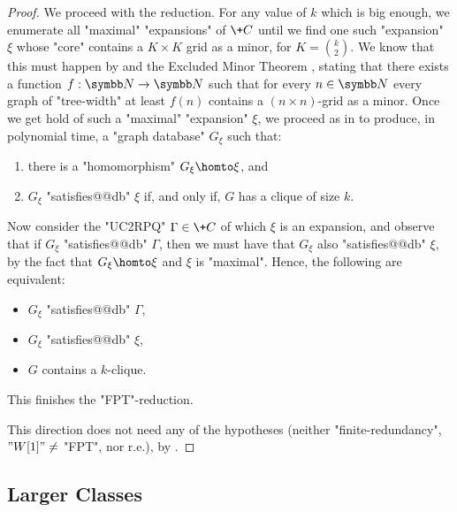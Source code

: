\begin{proof}
    We proceed with the reduction.
    For any value of $k$ which is big enough, we enumerate all "maximal" "expansions" of $\+C$ until we find one such "expansion" $\xi$ whose "core" contains a $K \times K$ grid as a minor, for $K = {k \choose 2}$.
    We know that this must happen by  and the Excluded Minor Theorem \cite{RobertsonSeymour1986GraphMinors5}, stating that there exists a function $f : \N \to \N$ such that for every $n \in \N$ every graph of "tree-width" at least $f(n)$ contains a $(n \times n)$-grid as a minor.
    Once we get hold of such a "maximal" "expansion" $\xi$, we proceed as in \cite[proof of Theorem~4.1]{Grohe2007ComplexityHomomorphism} to produce, in polynomial time, a "graph database" $G_\xi$ such that:
    \begin{enumerate}
        \item there is a "homomorphism" $G_\xi \homto \xi$, and
        \item $G_\xi$ "satisfies@@db" $\xi$ if, and only if, $G$ has a clique of size $k$.
    \end{enumerate}
Now consider the "UC2RPQ" $\Gamma \in \+C$ of which $\xi$ is an expansion, and observe that if $G_\xi$ "satisfies@@db" $\Gamma$, then we must have that $G_\xi$ also "satisfies@@db" $\xi$, by the fact that $G_\xi \homto \xi$ and $\xi$ is "maximal". Hence, the following are equivalent:
\begin{itemize}
    \item $G_\xi$ "satisfies@@db" $\Gamma$, 
    \item $G_\xi$ "satisfies@@db" $\xi$,
    \item $G$ contains a $k$-clique.
\end{itemize}
This finishes the "FPT"-reduction.

\medskip

 This direction does not need any of the hypotheses (neither "finite-redundancy",  $"W[1]" \neq $ "FPT", nor r.e.), by .
\end{proof}

\subsection{\AP{}Larger Classes}
\label{sec:discussion-larger-classes}

